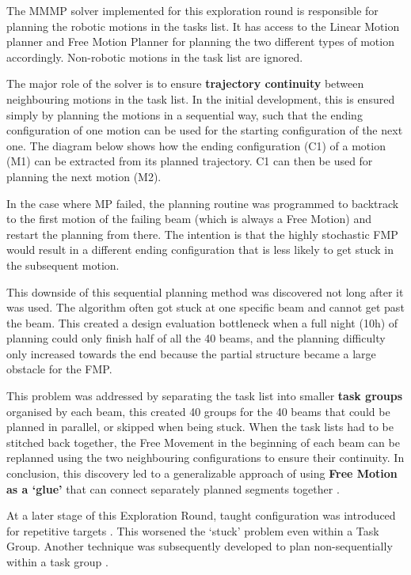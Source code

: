 The MMMP solver implemented for this exploration round is responsible for planning the robotic motions in the tasks list. It has access to the Linear Motion planner and Free Motion Planner for planning the two different types of motion accordingly. Non-robotic motions in the task list are ignored.




The major role of the solver is to ensure \textbf{trajectory continuity} between neighbouring motions in the task list. In the initial development, this is ensured simply by planning the motions in a sequential way, such that the ending configuration of one motion can be used for the starting configuration of the next one. The diagram below shows how the ending configuration (C1) of a motion (M1) can be extracted from its planned trajectory. C1 can then be used for planning the next motion (M2).




In the case where MP failed, the planning routine was programmed to backtrack to the first motion of the failing beam (which is always a Free Motion) and restart the planning from there. The intention is that the highly stochastic FMP would result in a different ending configuration that is less likely to get stuck in the subsequent motion.

This downside of this sequential planning method was discovered not long after it was used. The algorithm often got stuck at one specific beam and cannot get past the beam. This created a design evaluation bottleneck when a full night (10h) of planning could only finish half of all the 40 beams, and the planning difficulty only increased towards the end because the partial structure became a large obstacle for the FMP.

This problem was addressed by separating the task list into smaller \textbf{task groups }organised by each beam, this created 40 groups for the 40 beams that could be planned in parallel, or skipped when being stuck. When the task lists had to be stitched back together, the Free Movement in the beginning of each beam can be replanned using the two neighbouring configurations to ensure their continuity. In conclusion, this discovery led to a generalizable approach of using \textbf{Free Motion as a ‘glue’} that can connect separately planned segments together \parencite{lozanoperezConstraintBasedMethodSolving2014}.

At a later stage of this Exploration Round, taught configuration was introduced for repetitive targets . This worsened the ‘stuck’ problem even within a Task Group. Another technique was subsequently developed to plan non-sequentially within a task group .

